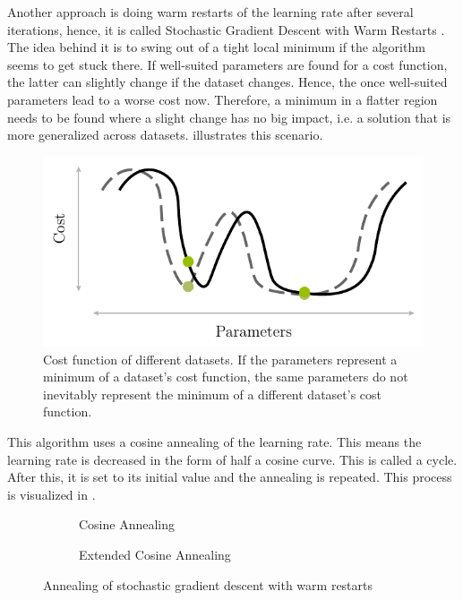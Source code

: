 Another approach is doing warm restarts of the learning rate after several iterations, hence, it is called Stochastic Gradient Descent with Warm Restarts \cite{DBLP:journals/corr/LoshchilovH16a}.
The idea behind it is to swing out of a tight local minimum if the algorithm seems to get stuck there.
If well-suited parameters are found for a cost function, the latter can slightly change if the dataset changes.
Hence, the once well-suited parameters lead to a worse cost now.
Therefore, a minimum in a flatter region needs to be found where a slight change has no big impact, i.e. a solution that is more generalized across datasets.
 illustrates this scenario.
\begin{figure}
	\centering
	\includegraphics[]{images/sgdr-cost.pdf}
	\caption[Cost function of different datasets]{Cost function of different datasets. If the parameters represent a minimum of a dataset's cost function, the same parameters do not inevitably represent the minimum of a different dataset's cost function.}
	\label{fig:sgdr-cost}
\end{figure}
This algorithm uses a cosine annealing of the learning rate.
This means the learning rate is decreased in the form of half a cosine curve.
This is called a cycle.
After this, it is set to its initial value and the annealing is repeated.
This process is visualized in .
\begin{figure}
	\setlength{}
	\setlength{}
	\centering
	\begin{subfigure}{.49\textwidth}
		\centering
		
		\caption{Cosine Annealing}
		\label{fig:sgdr-annealing-normal}
	\end{subfigure}%
	\setlength{}
	\begin{subfigure}{.49\textwidth}
		\centering
		
		\caption{Extended Cosine Annealing}
		\label{fig:sgdr-annealing-extended}
	\end{subfigure}
	\caption{Annealing of stochastic gradient descent with warm restarts}
	\label{fig:sgdr-annealing}
\end{figure}
